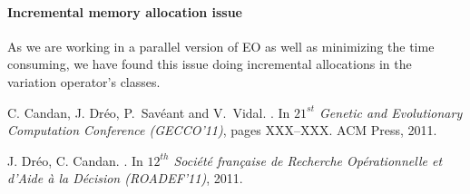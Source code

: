 \paragraph{Incremental memory allocation issue}

As we are working in a parallel version of EO as well as minimizing the time consuming, we have found this issue doing incremental allocations in the variation operator's classes.


\begin{thebibliography}{10}

C. Candan, J. Dr{\'e}o, P.~Sav\'eant and V.~Vidal.
.
\newblock In {\em $21^{st}$ Genetic and Evolutionary Computation Conference (GECCO'11)}, pages XXX--XXX. ACM Press, 2011.

J. Dr{\'e}o, C. Candan.
.
\newblock In {\em $12^{th}$ Société française de Recherche Opérationnelle et d’Aide à la Décision (ROADEF'11)}, 2011.

\end{thebibliography}










